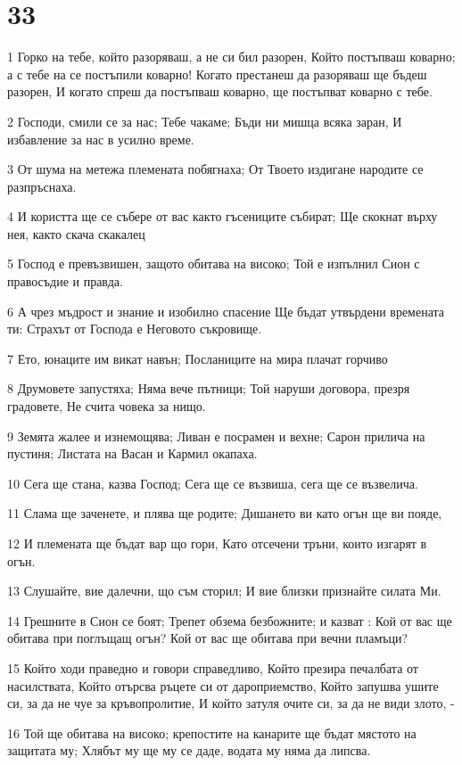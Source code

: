 \chapter{33}

\par 1 Горко на тебе, който разоряваш, а не си бил разорен, Който постъпваш коварно; а с тебе на се постъпили коварно! Когато престанеш да разоряваш ще бъдеш разорен, И когато спреш да постъпваш коварно, ще постъпват коварно с тебе.
\par 2 Господи, смили се за нас; Тебе чакаме; Бъди ни мишца всяка заран, И избавление за нас в усилно време.
\par 3 От шума на метежа племената побягнаха; От Твоето издигане народите се разпръснаха.
\par 4 И користта ще се събере от вас както гъсениците събират; Ще скокнат върху нея, както скача скакалец
\par 5 Господ е превъзвишен, защото обитава на високо; Той е изпълнил Сион с правосъдие и правда.
\par 6 А чрез мъдрост и знание и изобилно спасение Ще бъдат утвърдени времената ти: Страхът от Господа е Неговото съкровище.
\par 7 Ето, юнаците им викат навън; Посланиците на мира плачат горчиво
\par 8 Друмовете запустяха; Няма вече пътници; Той наруши договора, презря градовете, Не счита човека за нищо.
\par 9 Земята жалее и изнемощява; Ливан е посрамен и вехне; Сарон прилича на пустиня; Листата на Васан и Кармил окапаха.
\par 10 Сега ще стана, казва Господ; Сега ще се възвиша, сега ще се възвелича.
\par 11 Слама ще заченете, и плява ще родите; Дишането ви като огън ще ви пояде,
\par 12 И племената ще бъдат вар що гори, Като отсечени тръни, които изгарят в огън.
\par 13 Слушайте, вие далечни, що съм сторил; И вие близки признайте силата Ми.
\par 14 Грешните в Сион се боят; Трепет обзема безбожните; и казват : Кой от вас ще обитава при поглъщащ огън? Кой от вас ще обитава при вечни пламъци?
\par 15 Който ходи праведно и говори справедливо, Който презира печалбата от насилствата, Който отърсва ръцете си от дароприемство, Който запушва ушите си, за да не чуе за кръвопролитие, И който затуля очите си, за да не види злото, -
\par 16 Той ще обитава на високо; крепостите на канарите ще бъдат мястото на защитата му; Хлябът му ще му се даде, водата му няма да липсва.
